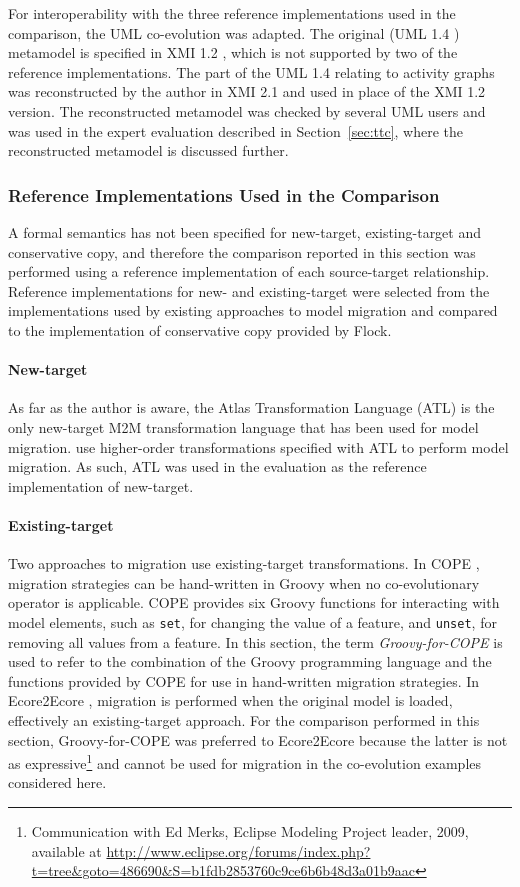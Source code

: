 For interoperability with the three reference implementations used in the comparison, the UML co-evolution was adapted. The original (UML 1.4 \cite{uml14}) metamodel is specified in XMI 1.2 \cite{xmi}, which is not supported by two of the reference implementations. The part of the UML 1.4 relating to activity graphs was reconstructed by the author in XMI 2.1 and used in place of the XMI 1.2 version. The reconstructed metamodel was checked by several UML users and was used in the expert evaluation described in Section~\ref{sec:ttc}, where the reconstructed metamodel is discussed further. 

\subsubsection{Reference Implementations Used in the Comparison}
A formal semantics has not been specified for new-target, existing-target and conservative copy, and therefore the comparison reported in this section was performed using a reference implementation of each source-target relationship. Reference implementations for new- and existing-target were selected from the implementations used by existing approaches to model migration and compared to the implementation of conservative copy provided by Flock.

\paragraph{New-target} As far as the author is aware, the Atlas Transformation Language (ATL) is the only new-target M2M transformation language that has been used for model migration. \cite{cicchetti08automating,garces09managing} use higher-order transformations specified with ATL to perform model migration. As such, ATL was used in the evaluation as the reference implementation of new-target.

\paragraph{Existing-target} Two approaches to migration use existing-target transformations. In COPE \cite{herrmannsdoerfer09cope}, migration strategies can be hand-written in Groovy when no co-evolutionary operator is applicable. COPE provides six Groovy functions for interacting with model elements, such as \texttt{set}, for changing the value of a feature, and \texttt{unset}, for removing all values from a feature. In this section, the term \emph{Groovy-for-COPE} is used to refer to the combination of the Groovy programming language and the functions provided by COPE for use in hand-written migration strategies. In Ecore2Ecore \cite{hussey06advanced}, migration is performed when the original model is loaded, effectively an existing-target approach. For the comparison performed in this section, Groovy-for-COPE was preferred to Ecore2Ecore because the latter is not as expressive\footnote{Communication with Ed Merks, Eclipse Modeling Project leader, 2009, available at \url{http://www.eclipse.org/forums/index.php?t=tree&goto=486690&S=b1fdb2853760c9ce6b6b48d3a01b9aac}} and cannot be used for migration in the co-evolution examples considered here.

